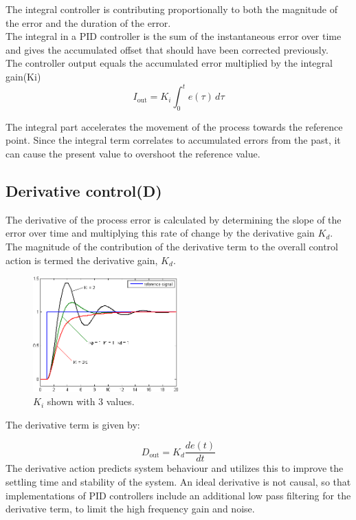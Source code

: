 The integral controller is contributing proportionally to both the magnitude of the error and the duration of the error. \\
The integral in a PID controller is the sum of the instantaneous error over time and gives the accumulated offset that should have been corrected previously. \\ 

The controller output equals the accumulated error multiplied by the integral gain(Ki)\\
$$I_{\mathrm{out}}=K_{i}\int_{0}^{t}{e(\tau)}\,{d\tau}$$ 

The integral part accelerates the movement of the process towards the reference point.
Since the integral term correlates to accumulated errors from the past, it can cause the present value to overshoot the reference value.

\subsection {Derivative control(D)} 

The derivative of the process error is calculated by determining the slope of the error over time and multiplying this rate of change by the derivative gain $K_d$. The magnitude of the contribution of the derivative term to the overall control action is termed the derivative gain, $K_d$.
\begin{figure}[h!]
  \centering
  \includegraphics[width=0.5\textwidth]{figures/Change_with_Ki.png}
  
  \caption{$K_i$ shown with 3 values.} 
  \label{PID controller}
\end{figure}

The derivative term is given by:

$$D_{\mathrm{out}}=K_d\frac{de(t)}{dt}$$
The derivative action predicts system behaviour and utilizes this to improve the settling time and stability of the system.
An ideal derivative is not causal, so that implementations of PID controllers include an additional low pass filtering for the derivative term, to limit the high frequency gain and noise.

